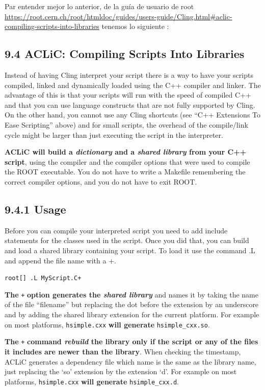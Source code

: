 \documentclass[11pt,letterpaper]{article}
\begin{document}
Par entender mejor lo anterior, de la guía de usuario de root \url{https://root.cern.ch/root/htmldoc/guides/users-guide/Cling.html#aclic-compiling-scripts-into-libraries} tenemos lo siguiente :

\begin{displayquote}
\section*{9.4 ACLiC: Compiling Scripts Into Libraries}
Instead of having Cling interpret your script there is a way to have your scripts compiled, linked and dynamically loaded using the C++ compiler and linker. The advantage of this is that your scripts will run with the speed of compiled C++ and that you can use language constructs that are not fully supported by Cling. On the other hand, you cannot use any Cling shortcuts (see “C++ Extensions To Ease Scripting” above) and for small scripts, the overhead of the compile/link cycle might be larger than just executing the script in the interpreter.

\textbf{ACLiC will build a \emph{dictionary} and a \emph{shared library} from your C++ script}, using the compiler and the compiler options that were used to compile the ROOT executable. You do not have to write a Makefile remembering the correct compiler options, and you do not have to exit ROOT.

\subsection*{9.4.1 Usage}
Before you can compile your interpreted script you need to add include statements for the classes used in the script. Once you did that, you can build and load a shared library containing your script. To load it use the command .L and append the file name with a +.

\verb|root[] .L MyScript.C+|

\textbf{The} \verb|+| \textbf{option generates the \emph{shared library}} and names it by taking the name of the file “filename” but replacing the dot before the extension by an underscore and by adding the shared library extension for the current platform. For example on most platforms, \verb|hsimple.cxx| \textbf{will generate} \verb|hsimple_cxx.so|.

\textbf{The} \verb|+|\textbf{ command \emph{rebuild} the library only if the script or any of the files it includes are newer than the library}. When checking the timestamp, ACLiC generates a dependency file which name is the same as the library name, just replacing the ‘so’ extension by the extension ‘d’. For example on most platforms, \verb|hsimple.cxx| \textbf{will generate} \verb|hsimple_cxx.d|.


\end{displayquote}
\end{document}
